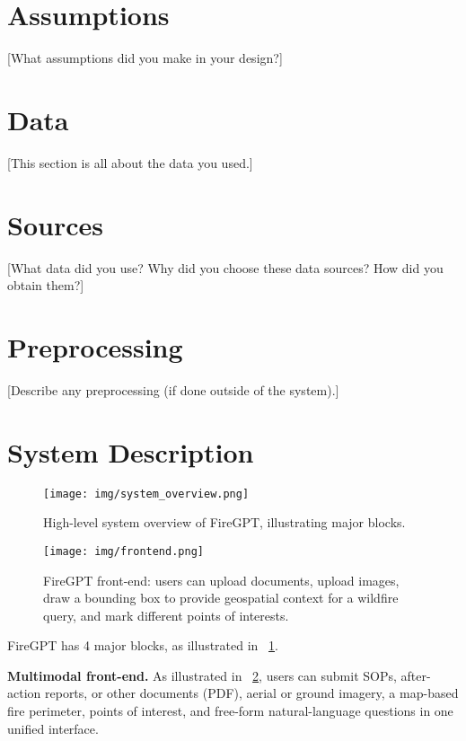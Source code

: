 \documentclass[lang=english,inputenc=utf8,fontsize=10pt]{ldvarticle}
\begin{document}
\section*{Assumptions}
[What assumptions did you make in your design?] 

\lipsum[5]

\newpage

\section{Data}
[This section is all about the data you used.] 

\lipsum[2]

\section*{Sources}
[What data did you use? Why did you choose these data sources? How did you obtain them?] 

\lipsum[6]

\section*{Preprocessing}
[Describe any preprocessing (if done outside of the system).] 

\lipsum[8]

\newpage

\section{System Description}

\begin{figure}[t]
  \centering
  \texttt{[image: img/system\_overview.png]}
  \caption{High-level system overview of FireGPT, illustrating major blocks.}
  \label{fig:system_overview}
\end{figure}


\begin{figure}[t]
  \centering
  \texttt{[image: img/frontend.png]}
  \caption{FireGPT front-end: users can upload documents, upload images, draw a
           bounding box to provide geospatial context for a wildfire query, and mark different points of interests.}
  \label{fig:frontend}
\end{figure}

FireGPT has 4 major blocks, as illustrated in ~\cref{fig:system_overview}.

\textbf{Multimodal front-end.}
As illustrated in ~\cref{fig:frontend}, users can submit
SOPs, after-action reports, or other documents (PDF), aerial or ground
imagery, a map-based fire perimeter, points of interest, and free-form
natural-language questions in one unified interface.
\end{document}
